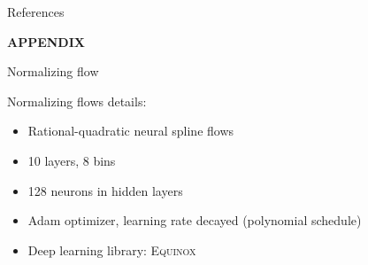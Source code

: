 \documentclass[usenames,dvipsnames,t]{beamer}
\begin{document}
\begin{frame}{References}

\nocite{*}

\printbibliography
    
\end{frame}


\appendix

\begin{frame}
\vfill
\centering
\textbf{APPENDIX}
\vfill
\end{frame}

\begin{frame}{Normalizing flow}

  \def\x{4mm}

  Normalizing flows details: 

  \vspace{\x}

  \begin{itemize}
    \item Rational-quadratic neural spline flows
    
    \vspace{\x}
    
    \item 10 layers, 8 bins
    
    \vspace{\x}
    
    \item 128 neurons in hidden layers
    
    \vspace{\x}
    
    \item Adam optimizer, learning rate decayed (polynomial schedule)
    
    \vspace{\x}
    
    \item Deep learning library: \textsc{Equinox}
  \end{itemize}
  
\end{frame}
\end{document}
